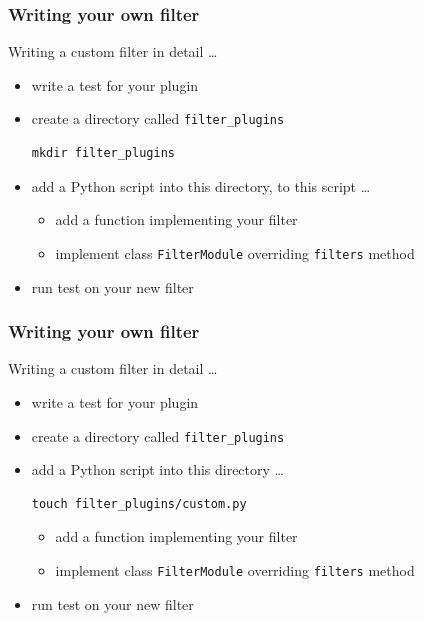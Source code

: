 \documentclass[pdf]{beamer}
\begin{document}
\begin{frame}[t,fragile]
  \frametitle{Writing your own filter}
  Writing a custom filter in detail \ldots
  \begin{itemize}
    \item {write a test for your plugin}
    \item \alert {create a directory called \texttt{filter\_plugins}}
      \begin{lstlisting}
mkdir filter_plugins
      \end{lstlisting}
    \item {add a Python script into this directory, to this script \ldots}
      \begin{itemize}
        \item {add a function implementing your filter}
        \item {implement class \texttt{FilterModule} overriding \texttt{filters} method}
      \end{itemize}
    \item {run test on your new filter}
  \end{itemize}
\end{frame}

\begin{frame}[t,fragile]
  \frametitle{Writing your own filter}
  Writing a custom filter in detail \ldots
  \begin{itemize}
    \item {write a test for your plugin}
    \item {create a directory called \texttt{filter\_plugins}}
    \item \alert {add a Python script into this directory \ldots}
      \begin{lstlisting}
touch filter_plugins/custom.py
      \end{lstlisting}
      \begin{itemize}
        \item {add a function implementing your filter}
        \item {implement class \texttt{FilterModule} overriding \texttt{filters} method}
      \end{itemize}
    \item {run test on your new filter}
  \end{itemize}
\end{frame}
\end{document}
